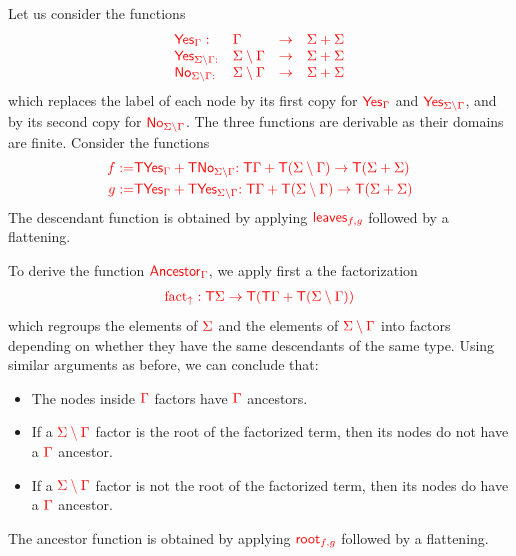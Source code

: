 \begin{example}
Let us consider the functions 
$$\begin{array}{llll}
\ranked{\mathsf{Yes}_\rGamma :} & \rGamma &\ranked{\to} &\ranked{ \rSigma+\rSigma}\\
 \ranked{\mathsf{Yes}_{\ranked{\rSigma\setminus\rGamma}:}}& \ranked{\rSigma\setminus\rGamma}&\ranked{\to} &\ranked{ \rSigma+\rSigma}\\
\ranked{\mathsf{No}_{\ranked{\rSigma\setminus\rGamma}: }}&\ranked{\rSigma\setminus\rGamma} &\ranked{\to}& \ranked{ \rSigma+\rSigma}
\end{array}$$
which replaces the label of each node by its first copy for $\ranked{\mathsf{Yes}_\Gamma}$ and $\ranked{\mathsf{Yes}_{\rSigma\setminus\rGamma}}$, and by its second copy for $\ranked{\mathsf{No}_{\rSigma\setminus\rGamma}}$. The three functions are derivable as their domains are finite. 
Consider the functions 
\begin{align*}
\ranked{f:=} &\ranked{ \tmonad\mathsf{Yes}_\rGamma +\tmonad\mathsf{No}_{\rSigma\setminus \rGamma}}\ranked{: \tmonad\rGamma+\tmonad(\rSigma\setminus\rGamma) \to \tmonad (\rSigma+\rSigma)}
\\
\ranked{g:=} & \ranked{ \tmonad\mathsf{Yes}_\rGamma
+\tmonad\mathsf{Yes}_{\rSigma\setminus \rGamma}}\ranked{: \tmonad\rGamma+\tmonad(\rSigma\setminus\rGamma) \to \tmonad (\rSigma+\rSigma)} 
\end{align*}
The descendant function is obtained by applying $\ranked{\mathsf{leaves}_{f,g}}$ followed by a flattening.

\smallskip
To derive the function $\ranked{\mathsf{Ancestor}_\Gamma}$, we apply first a the factorization
\begin{align*}
\ranked{\ancfact: \tmonad\rSigma\to \tmonad(\tmonad\rGamma+\tmonad(\rSigma\setminus\rGamma))}
\end{align*} which regroups the elements of $\rSigma$ and the elements of $\ranked{\rSigma\setminus\rGamma}$ into factors depending on whether they have the same descendants of the same type. 
Using similar arguments as before, we can conclude that:
\begin{itemize}
\item The nodes inside $\rGamma$ factors have $\rGamma$ ancestors.  
\item If a $\ranked{\rSigma\setminus\rGamma}$ factor is the root of the factorized term, then its nodes do not have a $\rGamma$ ancestor.
\item   If a $\ranked{\rSigma\setminus\rGamma}$ factor is not the root of the factorized term, then its nodes do have a $\rGamma$ ancestor.
\end{itemize}
The ancestor function is obtained by applying $\ranked{\mathsf{root}_{f,g}}$ followed by a flattening.
\end{example}

